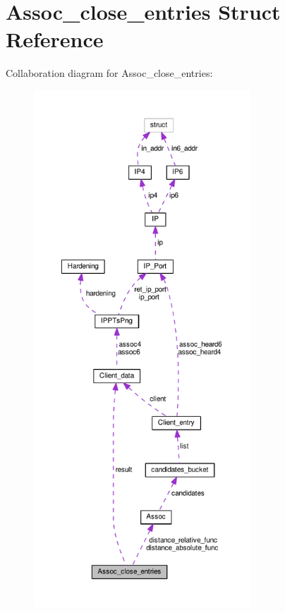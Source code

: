\hypertarget{struct_assoc__close__entries}{\section{Assoc\+\_\+close\+\_\+entries Struct Reference}
\label{struct_assoc__close__entries}
}


Collaboration diagram for Assoc\+\_\+close\+\_\+entries\+:\nopagebreak
\begin{figure}[H]
\begin{center}
\leavevmode
\includegraphics[height=550pt]{struct_assoc__close__entries__coll__graph}
\end{center}
\end{figure}
